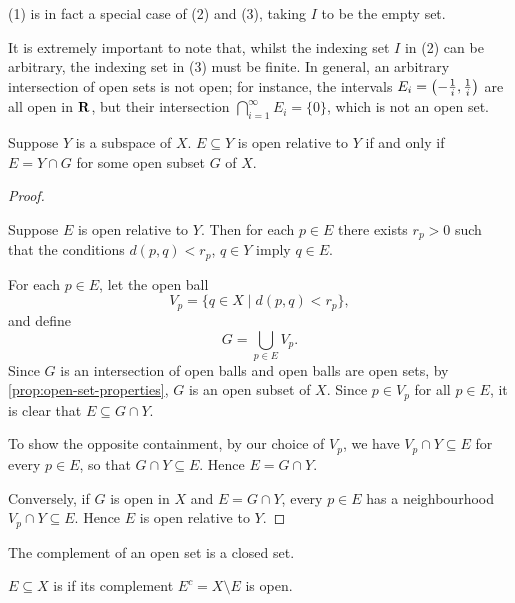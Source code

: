 \begin{remark}
(1) is in fact a special case of (2) and (3), taking $I$ to be the empty set.
\end{remark}

\begin{remark}
It is extremely important to note that, whilst the indexing set $I$ in (2) can be arbitrary, the indexing set in (3) must be finite. In general, an arbitrary intersection of open sets is not open; for instance, the intervals $E_i=\left(-\frac{1}{i},\frac{1}{i}\right)$ are all open in $\mathbf R$, but their intersection $\bigcap_{i=1}^\infty E_i=\{0\}$, which is not an open set.
\end{remark}

\begin{proposition}\label{prop:open-subspace-cap}
Suppose $Y$ is a subspace of $X$. $E\subseteq Y$ is open relative to $Y$ if and only if $E=Y\cap G$ for some open subset $G$ of $X$.
\end{proposition}

\begin{proof} \

\fbox{$\implies$} Suppose $E$ is open relative to $Y$. Then for each $p\in E$ there exists $r_p>0$ such that the conditions $d(p,q)<r_p$, $q\in Y$ imply $q\in E$.

For each $p\in E$, let the open ball
\[V_p=\{q\in X\mid d(p,q)<r_p\},\]
and define
\[G=\bigcup_{p\in E}V_p.\]
Since $G$ is an intersection of open balls and open balls are open sets, by \cref{prop:open-set-properties}, $G$ is an open subset of $X$. Since $p\in V_p$ for all $p\in E$, it is clear that $E\subseteq G\cap Y$.

To show the opposite containment, by our choice of $V_p$, we have $V_p\cap Y\subseteq E$ for every $p\in E$, so that $G\cap Y\subseteq E$. Hence $E=G\cap Y$.

\fbox{$\impliedby$} Conversely, if $G$ is open in $X$ and $E=G\cap Y$, every $p\in E$ has a neighbourhood $V_p\cap Y\subseteq E$. Hence $E$ is open relative to $Y$.
\end{proof}

The complement of an open set is a closed set.

\begin{definition}
$E\subseteq X$ is  if its complement $E^c=X\setminus E$ is open.
\end{definition}


